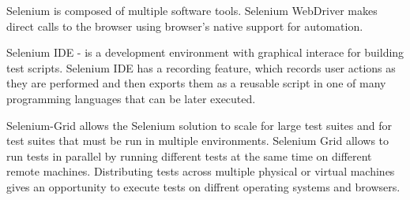       Selenium is composed of multiple software tools.
       Selenium  WebDriver makes direct calls to the browser using browser’s native support for automation.
       
       Selenium IDE - is a development environment with graphical interace for
       building test scripts.
       Selenium IDE has a recording feature, which records user actions as they are performed and
       then exports them as a reusable script in one of many programming languages that can be later executed.
       
       Selenium-Grid allows the Selenium solution to scale for large test
       suites and for test suites that must be run in multiple environments. 
       Selenium Grid allows to run tests in parallel by running different tests
       at the same time on different remote machines. Distributing tests across
       multiple physical or virtual machines gives an opportunity to execute
       tests on diffrent operating systems and browsers. 